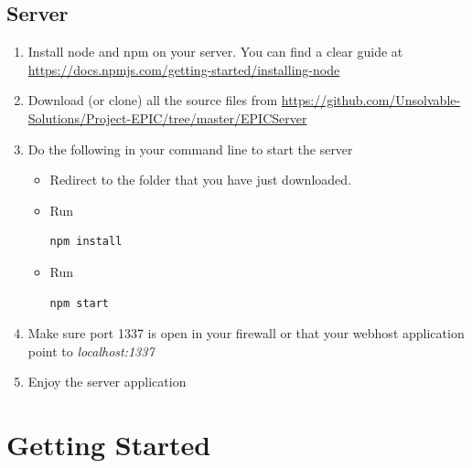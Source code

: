 \documentclass[a4paper,12pt,titlepage]{article}
\begin{document}
\subsection{Server}
\begin{enumerate}
\item Install node and npm on your server. You can find a clear guide at  \url{https://docs.npmjs.com/getting-started/installing-node}
\item Download (or clone) all the source files from \url{https://github.com/Unsolvable-Solutions/Project-EPIC/tree/master/EPICServer}
\item Do the following in your command line to start the server
\begin{itemize}
\item Redirect to the folder that you have just downloaded.
\item Run
\begin{verbatim}
npm install
\end{verbatim}
\item Run 
\begin{verbatim} 
npm start 
\end{verbatim}
\end{itemize}
\item Make sure port 1337 is open in your firewall or that your webhost application point to \textit{localhost:1337}
\item Enjoy the server application
\end{enumerate}


\newpage
\section{Getting Started}
\end{document}
